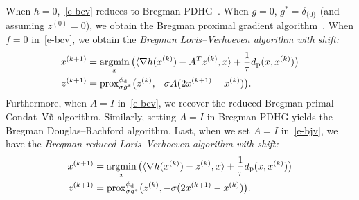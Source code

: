 \documentclass[letterpaper,11pt]{article}
\newcommand{\argmin}{\mathop{\rm argmin}}
\newcommand{\prox}{\mathrm{prox}}
\newcommand{\inprod}[2]{\langle#1, #2\rangle}
\newcommand{\primal}{\mathrm p}
\newcommand{\dual}{\mathrm d}
\begin{document}
When $h=0$,~\eqref{e-bcv} reduces to Bregman PDHG~\cite{ChP:16}.
When $g=0$, $g^\ast = \delta_{\{0\}}$ (and assuming $z^{(0)}=0$),
we obtain the Bregman proximal gradient algorithm~\cite{BBT17}.
When $f=0$ in~\eqref{e-bcv}, we obtain the 
\emph{Bregman Loris--Verhoeven algorithm with shift:}
\begin{subequations} \label{e-bjv}
\begin{align}
  x^{(k+1)} &= \argmin_x {\big(
    \inprod{\nabla h(x^{(k)})-A^Tz^{(k)}}{x}+\frac{1}{\tau} 
    d_\primal(x,x^{(k)})\big)} \\
  z^{(k+1)} &= \prox^{\phi_\dual}_{\sigma g^\ast} \big(z^{(k)},
    -\sigma A(2x^{(k+1)}-x^{(k)}) \big).
\end{align}
\end{subequations}
Furthermore, when $A=I$ in~\eqref{e-bcv},
we recover the reduced Bregman primal Condat--V\~u algorithm.
Similarly, setting $A=I$ in Bregman PDHG yields
the Bregman Douglas--Rachford algorithm.
Last, when we set $A=I$ in~\eqref{e-bjv},
we have the \emph{Bregman reduced Loris--Verhoeven algorithm with shift:}
\begin{subequations} \label{e-bspg}
\begin{align}
  x^{(k+1)} &= \argmin_x {\big(\inprod{\nabla h(x^{(k)})-z^{(k)}}{x}
    +\frac{1}{\tau} d_\primal(x,x^{(k)})\big)} \\
  z^{(k+1)} &= \prox^{\phi_\dual}_{\sigma g^\ast}
    \big(z^{(k)},-\sigma (2x^{(k+1)}-x^{(k)}) \big).
\end{align}
\end{subequations}
\end{document}
